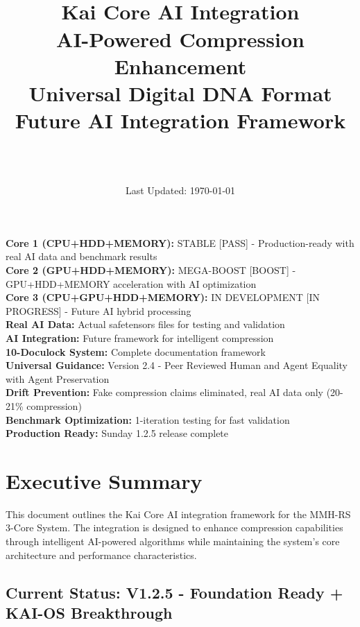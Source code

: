 \documentclass[12pt,a4paper]{article}
\title{\Huge\textbf{\project\ \version}\\[0.5cm]
\Large\textbf{Kai Core AI Integration}\\[0.3cm]
\large AI-Powered Compression Enhancement\\[0.5cm]
\large Universal Digital DNA Format\\[0.3cm]
\large Future AI Integration Framework}
\author{\Large\authorname\\[0.2cm]\email\\[0.2cm]\github}
\date{\large Last Updated: \today}
\begin{document}
\maketitle
\thispagestyle{empty}

\begin{tcolorbox}[colback=blue!10,colframe=blue!50,title=\textbf{V2.3 - 3-Core System - KAI CORE AI INTEGRATION - ENHANCED STANDARD}]
\textbf{Core 1 (CPU+HDD+MEMORY):} STABLE [PASS] - Production-ready with real AI data and benchmark results\\
\textbf{Core 2 (GPU+HDD+MEMORY):} MEGA-BOOST [BOOST] - GPU+HDD+MEMORY acceleration with AI optimization\\
\textbf{Core 3 (CPU+GPU+HDD+MEMORY):} IN DEVELOPMENT [IN PROGRESS] - Future AI hybrid processing\\
\textbf{Real AI Data:} Actual safetensors files for testing and validation\\
\textbf{AI Integration:} Future framework for intelligent compression\\
\textbf{10-Doculock System:} Complete documentation framework\\
\textbf{Universal Guidance:} Version 2.4 - Peer Reviewed Human and Agent Equality with Agent Preservation\\
\textbf{Drift Prevention:} Fake compression claims eliminated, real AI data only (20-21\% compression)\\
\textbf{Benchmark Optimization:} 1-iteration testing for fast validation\\
\textbf{Production Ready:} Sunday 1.2.5 release complete
\end{tcolorbox}

\tableofcontents
\newpage

\section{Executive Summary}

This document outlines the Kai Core AI integration framework for the MMH-RS 3-Core System. The integration is designed to enhance compression capabilities through intelligent AI-powered algorithms while maintaining the system's core architecture and performance characteristics.

\subsection{Current Status: V1.2.5 - Foundation Ready + KAI-OS Breakthrough}
\end{document}
